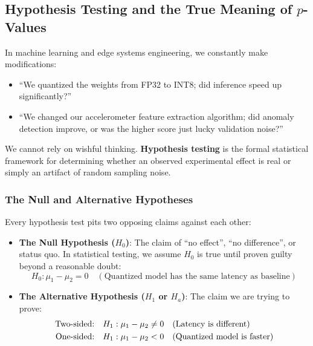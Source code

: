 \subsection{Hypothesis Testing and the True Meaning of $p$-Values}\label{subsec:stat_hypothesis_testing}

In machine learning and edge systems engineering, we constantly make modifications:
\begin{itemize}
    \item ``We quantized the weights from FP32 to INT8; did inference speed up significantly?''
    \item ``We changed our accelerometer feature extraction algorithm; did anomaly detection improve, or was the higher score just lucky validation noise?''
\end{itemize}
We cannot rely on wishful thinking. \textbf{Hypothesis testing} is the formal statistical framework for determining whether an observed experimental effect is real or simply an artifact of random sampling noise.

\subsubsection{The Null and Alternative Hypotheses}
Every hypothesis test pits two opposing claims against each other:
\begin{itemize}
    \item \textbf{The Null Hypothesis ($H_0$)}: The claim of ``no effect'', ``no difference'', or status quo. In statistical testing, we assume $H_0$ is true until proven guilty beyond a reasonable doubt:
    \begin{equation}
    H_0: \mu_1 - \mu_2 = 0 \quad (\text{Quantized model has the same latency as baseline})
    \end{equation}
    \item \textbf{The Alternative Hypothesis ($H_1$ or $H_a$)}: The claim we are trying to prove:
    \begin{align}
    \text{Two-sided:}\quad &H_1: \mu_1 - \mu_2 \ne 0 \quad (\text{Latency is different}) \notag\\
    \text{One-sided:}\quad &H_1: \mu_1 - \mu_2 < 0 \quad (\text{Quantized model is faster})
    \end{align}
\end{itemize}

